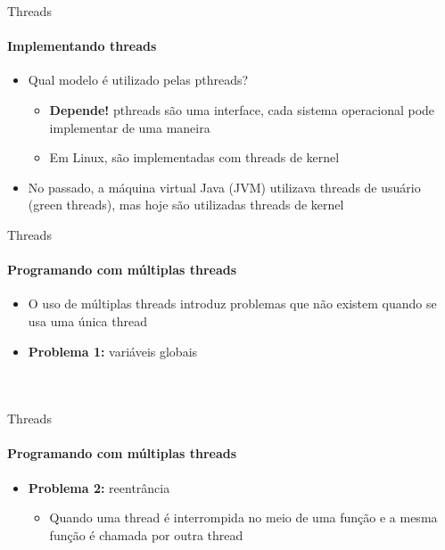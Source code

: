 \documentclass{beamer}
\begin{document}
\begin{frame}{Threads}
	\framesubtitle{Implementando threads}
	\begin{itemize}
		\item Qual modelo é utilizado pelas pthreads?
		\begin{itemize}
			\item \textbf{Depende!} pthreads são uma interface, cada sistema operacional pode implementar de uma maneira
			\item Em Linux, são implementadas com threads de kernel
		\end{itemize}
		\item No passado, a máquina virtual Java (JVM) utilizava threads de usuário (green threads), mas hoje são utilizadas threads de kernel
	\end{itemize}
\end{frame}
\begin{frame}{Threads}
	\framesubtitle{Programando com múltiplas threads}
	\begin{itemize}
		\item O uso de múltiplas threads introduz problemas que não existem quando se usa uma única thread
		\item \textbf{Problema 1:} variáveis globais
		\begin{columns}
			\begin{column}{0.5\textwidth}
				\inputminted[fontsize=\footnotesize]{c}{resources/globals1.c}
			\end{column}
			\begin{column}{0.5\textwidth}
				\inputminted[fontsize=\footnotesize]{c}{resources/globals2.c}
			\end{column}
		\end{columns}
	\end{itemize}
\end{frame}
\begin{frame}{Threads}
	\framesubtitle{Programando com múltiplas threads}
	\begin{itemize}
		\item \textbf{Problema 2:} reentrância
		\begin{itemize}
			\item Quando uma thread é interrompida no meio de uma função e a mesma função é chamada por outra thread
		\end{itemize}
		\inputminted[fontsize=\footnotesize]{c}{resources/globals1.c}
	\end{itemize}
\end{frame}
\end{document}
